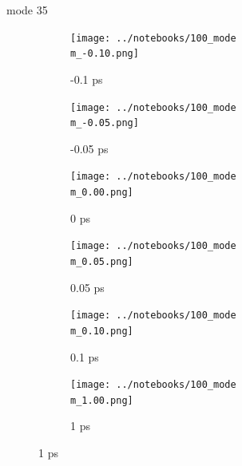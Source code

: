\documentclass{beamer}
\newcommand\w{0.32}
\begin{document}
\renewcommand\m{35}
\begin{frame}{mode \m}
	\begin{figure}
		\centering
		\begin{subfigure}[b]{\w\textwidth}
			\centering
			\texttt{[image: ../notebooks/100\_mode\\m\_-0.10.png]}
			\caption{-0.1 ps}
		\end{subfigure}
		\begin{subfigure}[b]{\w\textwidth}
			\centering
			\texttt{[image: ../notebooks/100\_mode\\m\_-0.05.png]}
			\caption{-0.05 ps}
		\end{subfigure}
		\begin{subfigure}[b]{\w\textwidth}
			\centering
			\texttt{[image: ../notebooks/100\_mode\\m\_0.00.png]}
			\caption{0 ps}
		\end{subfigure}
		\begin{subfigure}[b]{\w\textwidth}
			\centering
			\texttt{[image: ../notebooks/100\_mode\\m\_0.05.png]}
			\caption{0.05 ps}
		\end{subfigure}
		\begin{subfigure}[b]{\w\textwidth}
			\centering
			\texttt{[image: ../notebooks/100\_mode\\m\_0.10.png]}
			\caption{0.1 ps}
		\end{subfigure}
		\begin{subfigure}[b]{\w\textwidth}
			\centering
			\texttt{[image: ../notebooks/100\_mode\\m\_1.00.png]}
			\caption{1 ps}
		\end{subfigure}
	\end{figure}
\end{frame}
\end{document}
